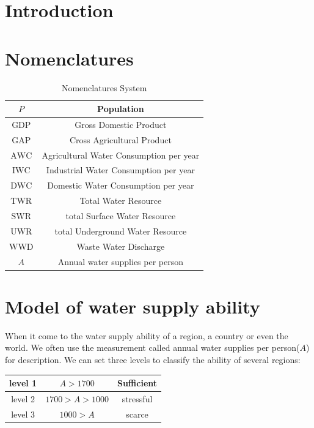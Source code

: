 
\section{Introduction}

\section{Nomenclatures}

\begin{table}[!htb]
  \caption{Nomenclatures System}
  \centering
  \begin{tabular}{||c|c||}
    \hline
    $P$   & Population \\
    \hline
    $\text{GDP}$ & Gross Domestic Product \\
    \hline
    $\text{GAP}$ & Cross Agricultural Product \\
    \hline
    $\text{AWC}$ & Agricultural Water Consumption per year \\
    \hline
    $\text{IWC}$ & Industrial Water Consumption per year \\
    \hline
    $\text{DWC}$ & Domestic Water Consumption per year \\
    \hline
    $\text{TWR}$ & Total Water Resource \\
    \hline
    $\text{SWR}$ & total Surface Water Resource \\
    \hline
    $\text{UWR}$ & total Underground Water Resource \\
    \hline

    $\text{WWD}$ & Waste Water Discharge \\
    \hline

    $A$          & Annual water supplies per person \\
    \hline
  \end{tabular}
\end{table}

\section{Model of water supply ability}
  When it come to the water supply ability of a region, a country or even the world. We often use the measurement called annual water supplies per person($A$) for description\cite{AbilityMeasure}. We can set three levels to classify the ability of several regions:
  \begin{table}[!htb]
    \centering
    \begin{tabular}{|c||c|c|}
    \hline
    level 1   & $A>1700$ & Sufficient \\
    \hline
    level 2   & $1700>A>1000$ & stressful \\
    \hline
    level 3   & $1000>A$ & scarce \\
    \hline
    \end{tabular}
  \end{table}

